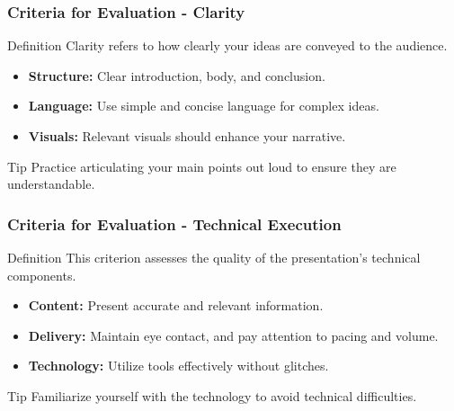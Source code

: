 \documentclass[aspectratio=169]{beamer}
\begin{document}
\begin{frame}[fragile]
    \frametitle{Criteria for Evaluation - Clarity}
    \begin{block}{Definition}
        Clarity refers to how clearly your ideas are conveyed to the audience.
    \end{block}
    \begin{itemize}
        \item \textbf{Structure:} Clear introduction, body, and conclusion.
        \item \textbf{Language:} Use simple and concise language for complex ideas.
        \item \textbf{Visuals:} Relevant visuals should enhance your narrative.
    \end{itemize}

    \begin{block}{Tip}
        Practice articulating your main points out loud to ensure they are understandable.
    \end{block}
\end{frame}

\begin{frame}[fragile]
    \frametitle{Criteria for Evaluation - Technical Execution}
    \begin{block}{Definition}
        This criterion assesses the quality of the presentation's technical components.
    \end{block}
    \begin{itemize}
        \item \textbf{Content:} Present accurate and relevant information.
        \item \textbf{Delivery:} Maintain eye contact, and pay attention to pacing and volume.
        \item \textbf{Technology:} Utilize tools effectively without glitches.
    \end{itemize}

    \begin{block}{Tip}
        Familiarize yourself with the technology to avoid technical difficulties.
    \end{block}
\end{frame}
\end{document}
